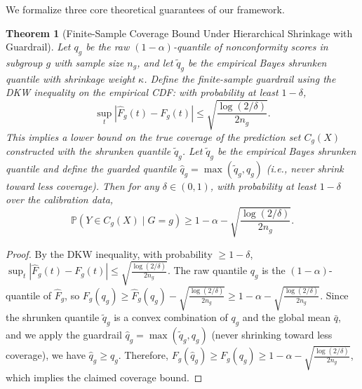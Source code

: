 \documentclass[11pt,a4paper]{article}
\theoremstyle{plain}
\newtheorem{theorem}{Theorem}
\begin{document}
We formalize three core theoretical guarantees of our framework.

\begin{theorem}[Finite-Sample Coverage Bound Under Hierarchical Shrinkage with Guardrail]
\label{thm:coverage_bound}
Let $q_g$ be the raw $(1-\alpha)$-quantile of nonconformity scores in subgroup $g$ with sample size $n_g$, and let $\tilde{q}_g$ be the empirical Bayes shrunken quantile with shrinkage weight $\kappa$. Define the finite-sample guardrail using the DKW inequality on the empirical CDF: with probability at least $1-\delta$,
\begin{equation}
\sup_t |\hat{F}_g(t) - F_g(t)| \le \sqrt{\frac{\log(2/\delta)}{2n_g}}.
\end{equation}
This implies a lower bound on the true coverage of the prediction set $C_g(X)$ constructed with the shrunken quantile $\tilde{q}_g$. Let $\tilde{q}_g$ be the empirical Bayes shrunken quantile and define the guarded quantile $\hat{q}_g = \max(\tilde{q}_g, q_g)$ (i.e., never shrink toward less coverage). Then for any $\delta \in (0,1)$, with probability at least $1-\delta$ over the calibration data,
\begin{equation}
\mathbb{P}(Y \in C_g(X) \mid G=g) \ge 1-\alpha - \sqrt{\frac{\log(2/\delta)}{2n_g}}.
\end{equation}
\end{theorem}

\begin{proof}
By the DKW inequality, with probability $\ge 1-\delta$, $\sup_t |\hat{F}_g(t) - F_g(t)| \le \sqrt{\frac{\log(2/\delta)}{2n_g}}$. The raw quantile $q_g$ is the $(1-\alpha)$-quantile of $\hat{F}_g$, so $F_g(q_g) \ge \hat{F}_g(q_g) - \sqrt{\frac{\log(2/\delta)}{2n_g}} \ge 1-\alpha - \sqrt{\frac{\log(2/\delta)}{2n_g}}$. Since the shrunken quantile $\tilde{q}_g$ is a convex combination of $q_g$ and the global mean $\bar{q}$, and we apply the guardrail $\hat{q}_g = \max(\tilde{q}_g, q_g)$ (never shrinking toward less coverage), we have $\hat{q}_g \ge q_g$. Therefore, $F_g(\hat{q}_g) \ge F_g(q_g) \ge 1-\alpha - \sqrt{\frac{\log(2/\delta)}{2n_g}}$, which implies the claimed coverage bound.
\end{proof}
\end{document}
